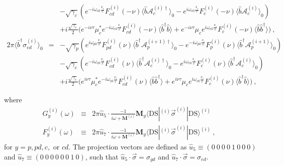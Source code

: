 \documentclass[aps, pra, reprint, amsmath, amssymb, groupedaddress, acknowledgments]{revtex4-1}
\begin{document}
\begin{widetext}
\begin{eqnarray}
&&-\sqrt{\gamma_c} (e^{-i\omega_{c0} \frac{x_i}{c}} F^{(i)}_{cd}(-\nu) \langle \hat{b}\mathcal{A}_c^{(i)\dag} \rangle_0 - e^{i\omega_{c0} \frac{x_i}{c}} F^{(i)}_{c}(-\nu) \langle \hat{b} \mathcal{A}_c^{(i)} \rangle_0) \nonumber \\
&&+ i\frac{\sqrt{\gamma_c}}{2}\big(e^{-i\nu\tau}\mu_c^\ast e^{-i\omega_{c0} \frac{x_i}{c}} F^{(i)}_{cd}(-\nu) \langle \hat{b}^\dag \hat{b}\rangle + e^{-i\nu\tau}\mu_c e^{i\omega_{c0} \frac{x_i}{c}} F^{(i)}_c(-\nu) \langle\hat{b} \hat{b}^\dag \rangle \big)~, \\
2 \pi \langle \hat{b}^\dag \sigma_{ed}^{(i)} \rangle_0 &=& -\sqrt{\gamma_p} (e^{i\omega_{p0} \frac{x_i}{c}} F^{(i)}_{pd}(\nu) \langle \hat{b}^\dag \mathcal{A}_p^{(i+1)\dag} \rangle_0 - e^{-i\omega_{p0} \frac{x_i}{c}} F^{(i)}_{p}(\nu) \langle \hat{b}^\dag \mathcal{A}_p^{(i+1)} \rangle_0) \nonumber \\
&&-\sqrt{\gamma_c} (e^{-i\omega_{c0} \frac{x_i}{c}} F^{(i)}_{cd}(\nu) \langle \hat{b}^\dag \mathcal{A}_c^{(i)\dag} \rangle_0 - e^{i\omega_{c0} \frac{x_i}{c}} F^{(i)}_{c}(\nu) \langle \hat{b}^\dag \mathcal{A}_c^{(i)} \rangle_0) \nonumber \\
&&+ i\frac{\sqrt{\gamma_c}}{2}\big(e^{i\nu\tau}\mu_c^\ast e^{-i\omega_{c0} \frac{x_i}{c}} F^{(i)}_{cd}(\nu) \langle \hat{b} \hat{b}^\dag\rangle + e^{i\nu\tau}\mu_c e^{i\omega_{c0} \frac{x_i}{c}} F^{(i)}_c(\nu) \langle\hat{b}^\dag \hat{b}\rangle \big)~,
\end{eqnarray}
\end{widetext}
where
\begin{eqnarray} \label{eq:G}
G^{(i)}_y(\omega) &\equiv& 2\pi \hat{u}_5\cdot\frac{-1}{i\omega+\mathbf{M}^{(i)}}\mathbf{M}_y\langle \textrm{DS}|^{(i)}\vec{\sigma}^{(i)}|\textrm{DS}\rangle^{(i)} \\
F^{(i)}_y(\omega) &\equiv& 2\pi \hat{u}_7\cdot\frac{-1}{i\omega+\mathbf{M}^{(i)}}\mathbf{M}_y\langle\textrm{DS}|^{(i)} \vec{\sigma}^{(i)}|\textrm{DS}\rangle^{(i)}~,~~ \label{eq:F}
\end{eqnarray}
for $y=p, pd, c,$ or $cd$.
The projection vectors are defined as $\hat{u}_5 \equiv (0~0~0~0~1~0~0~0)$ and $\hat{u}_7 \equiv (0~0~0~0~0~0~1~0)$, such that $\hat{u}_5\cdot \vec{\sigma}=\sigma_{gd}$ and $\hat{u}_7\cdot \vec{\sigma}=\sigma_{ed}$.  
\end{document}
